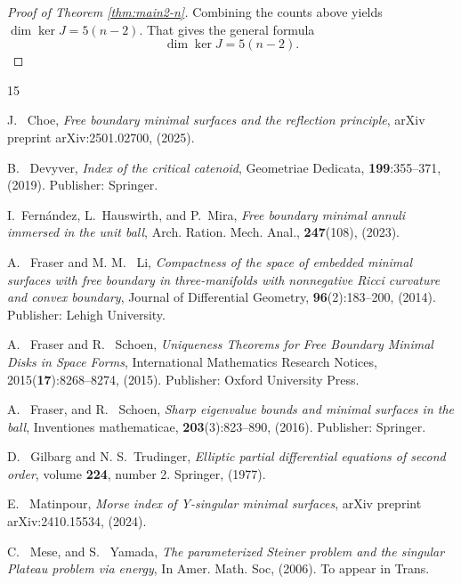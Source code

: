 \documentclass[11pt]{amsart}
\numberwithin{equation}{section}
\theoremstyle{theorem}
\theoremstyle{definition}
\numberwithin{equation}{section}
\begin{document}
\begin{proof}[Proof of Theorem \ref{thm:main2-n}]
\medskip

Combining the counts above yields $\dim\ker J=5(n-2)$.  That gives the general formula
\[
\dim\ker J = 5(n-2).
\]
\end{proof}



\begin{thebibliography}{15}

J. ~Choe, 
\emph{Free boundary minimal surfaces and the reflection principle},
arXiv preprint arXiv:2501.02700, (2025).


B. ~Devyver,
\emph{Index of the critical catenoid},
Geometriae Dedicata, \textbf{199}:355--371, (2019).
Publisher: Springer.

I.~Fernández, L.~Hauswirth, and P.~Mira,
\emph{Free boundary minimal annuli immersed in the unit ball},
 Arch. Ration. Mech. Anal., \textbf{247}(108), (2023).

A. ~Fraser and M. M. ~Li, 
\emph{Compactness of the space of embedded minimal surfaces with free boundary in three-manifolds with nonnegative Ricci curvature and convex boundary},
Journal of Differential Geometry, \textbf{96}(2):183--200, (2014).
Publisher: Lehigh University.

A. ~Fraser and R. ~Schoen, 
\emph{Uniqueness Theorems for Free Boundary Minimal Disks in
Space Forms}, International Mathematics Research Notices, 2015(\textbf{17}):8268--8274, (2015).
Publisher: Oxford University Press.

A. ~Fraser, and R. ~Schoen, 
\emph{Sharp eigenvalue bounds and minimal surfaces in the ball},
Inventiones mathematicae, \textbf{203}(3):823--890, (2016).
Publisher: Springer.

D. ~Gilbarg and N. S.~Trudinger, 
\emph{Elliptic partial differential equations of second order}, volume \textbf{224}, number 2.
Springer, (1977).

E. ~Matinpour, 
\emph{Morse index of Y-singular minimal surfaces},
arXiv preprint arXiv:2410.15534, (2024).

C. ~Mese, and S. ~Yamada, 
\emph{The parameterized Steiner problem and the singular Plateau problem via energy},
In Amer. Math. Soc, (2006).
To appear in Trans.


\end{thebibliography}
\end{document}

